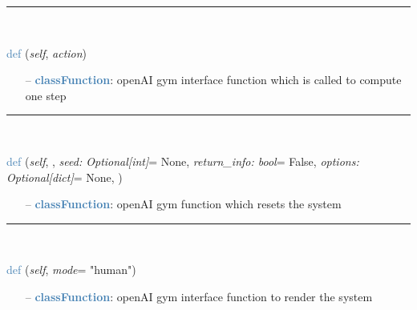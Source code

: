 \begin{itemize}[leftmargin=1.4cm]
%
\noindent\rule{8cm}{0.75pt}\vspace{1pt} \\ 
\begin{flushleft}
\noindent \textcolor{steelblue}{def {\bf {}}}\label{sec:artificialIntelligence:OpenAIGymInterfaceEnv:step}
({\it self}, {\it action})
\end{flushleft}
\setlength{\itemindent}{0.7cm}
\begin{itemize}[leftmargin=0.7cm]
  \item[--]  \textcolor{steelblue}{\bf classFunction}: openAI gym interface function which is called to compute one step\vspace{12pt}\end{itemize}
%
\noindent\rule{8cm}{0.75pt}\vspace{1pt} \\ 
\begin{flushleft}
\noindent \textcolor{steelblue}{def {\bf {}}}\label{sec:artificialIntelligence:OpenAIGymInterfaceEnv:reset}
({\it self}, {\it *}, {\it seed: Optional[int]}= None, {\it return\_info: bool}= False, {\it options: Optional[dict]}= None, {\it })
\end{flushleft}
\setlength{\itemindent}{0.7cm}
\begin{itemize}[leftmargin=0.7cm]
  \item[--]  \textcolor{steelblue}{\bf classFunction}: openAI gym function which resets the system\vspace{12pt}\end{itemize}
%
\noindent\rule{8cm}{0.75pt}\vspace{1pt} \\ 
\begin{flushleft}
\noindent \textcolor{steelblue}{def {\bf {}}}\label{sec:artificialIntelligence:OpenAIGymInterfaceEnv:render}
({\it self}, {\it mode}= "human")
\end{flushleft}
\setlength{\itemindent}{0.7cm}
\begin{itemize}[leftmargin=0.7cm]
  \item[--]  \textcolor{steelblue}{\bf classFunction}: openAI gym interface function to render the system\vspace{12pt}\end{itemize}

\end{itemize}
